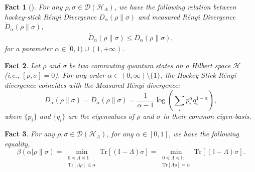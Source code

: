 \documentclass[onecolumn,ldraftcls, 11pt]{IEEEtran}
\newtheorem{fact}{Fact}
\newcommand{\tr}{\mathrm{Tr}}
\newcommand*{\bbI}{\mathbb{I}}
\newcommand*{\cH}{\mathcal{H}}
\newcommand*{\cD}{\mathcal{D}}
\begin{document}
\begin{fact}[\cite{Hirche_2024}]\label{fact_P_div_integral_rep}
    For any $\rho,\sigma \in \cD(\cH_A)$, 
    we have the following relation between
        hockey-stick R\'enyi Divergence $D_\alpha(\rho\|\sigma)$ and measured R\'enyi Divergence $\check{D}_\alpha(\rho\|\sigma)$,
    \begin{align}
    \check{D}_\alpha(\rho \| \sigma) \le D_\alpha(\rho \| \sigma) ,
    \label{fact_P_div_integral_rep_eq} 
    \end{align}
for a parameter $\alpha \in [0,1) \cup (1,+\infty)$.
\end{fact}

\begin{fact}
\label{fact:commuting_renyi_full}
Let $\rho$ and $\sigma$ be two commuting quantum states on a Hilbert space $\mathcal{H}$ (i.e., $[\rho, \sigma] = 0$). For any order $\alpha \in (0, \infty) \setminus \{1\}$, the Hockey Stick R\'enyi divergence coincides with the Measured R\'enyi divergence:
\begin{equation}
    D_{\alpha}(\rho \| \sigma) = \check{D}_{\alpha}(\rho \| \sigma) = \frac{1}{\alpha-1} \log \left( \sum_i p_i^\alpha q_i^{1-\alpha} \right),
\end{equation}
where $\{p_i\}$ and $\{q_i\}$ are the eigenvalues of $\rho$ and $\sigma$ in their common eigen-basis.
\end{fact}




\begin{fact}\label{T_hyp_func_equi}
    For any $\rho,\sigma \in \cD(\cH_A)$, for any $\alpha \in [0,1]$, we have the following equality,
    \begin{equation}\beta(\alpha|\rho\|\sigma) =
        \min_{\substack{0 \preceq \Lambda \preceq \bbI:\\
        \tr[\Lambda \rho] \leq \alpha}} \tr[(\bbI - \Lambda)\sigma] = \min_{\substack{0 \preceq \Lambda \preceq \bbI:\\
        \tr[\Lambda \rho] = \alpha}} \tr[(\bbI - \Lambda)\sigma].
        \label{T_hyp_func_equi_eq}
    \end{equation}
\end{fact}
\end{document}
